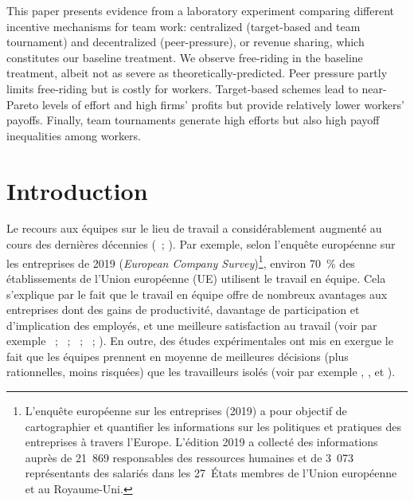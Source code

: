 \begin{Article}
\begin{refsection}[Lebourges]
\begin{resumeENG}
This paper presents evidence from a laboratory experiment comparing
different incentive mechanisms for team work: centralized (target-based
and team tournament) and decentralized (peer-pressure), or revenue
sharing, which constitutes our baseline treatment. We observe
free-riding in the baseline treatment, albeit not as severe as
theoretically-predicted. Peer pressure partly limits free-riding but is
costly for workers. Target-based schemes lead to near-Pareto levels of
effort and high firms' profits but provide relatively lower workers'
payoffs. Finally, team tournaments generate high efforts but also high
payoff inequalities among workers.        
\end{resumeENG}





\section{Introduction}

Le recours aux équipes sur le lieu de travail a considérablement
augmenté au cours des dernières décennies (\textcite{Owan2014}~; \textcite{LazearShaw2007}). Par exemple, selon l'enquête européenne sur les
entreprises de 2019 (\emph{European Company Survey})\footnote{L'enquête européenne sur les entreprises (2019) a pour objectif de cartographier et quantifier les informations sur les politiques et pratiques des entreprises à travers l'Europe. L'édition 2019 a collecté des informations auprès de 21~869 responsables des ressources humaines et de 3~073 représentants des salariés dans les 27~États membres de l'Union européenne et au Royaume-Uni.}, environ 70~\% des établissements de l'Union européenne (UE) utilisent le travail en équipe. Cela s'explique par le fait que le travail en équipe offre de
nombreux avantages aux entreprises dont des gains de productivité, davantage de participation et d'implication des employés, et une meilleure satisfaction au travail (voir par exemple \textcite{GuzzoDickson1996}~; \textcite{CohenBailey1997}~; \textcite{MerchantVanderStede2007}~; \textcite{DelarueVanHootegemProcterBurridge2008}~; \textcite{Owan2014}). En
outre, des études expérimentales ont mis en exergue le fait que les
équipes prennent en moyenne de meilleures décisions (plus rationnelles,
moins risquées) que les travailleurs isolés (voir par exemple \textcite{CooperKagel2005}, \textcite{KocherSutter2005}, \textcite{KocherStrauSutter2006} et \textcite{CharnessSutter2012}).


\end{refsection}
\end{Article}
